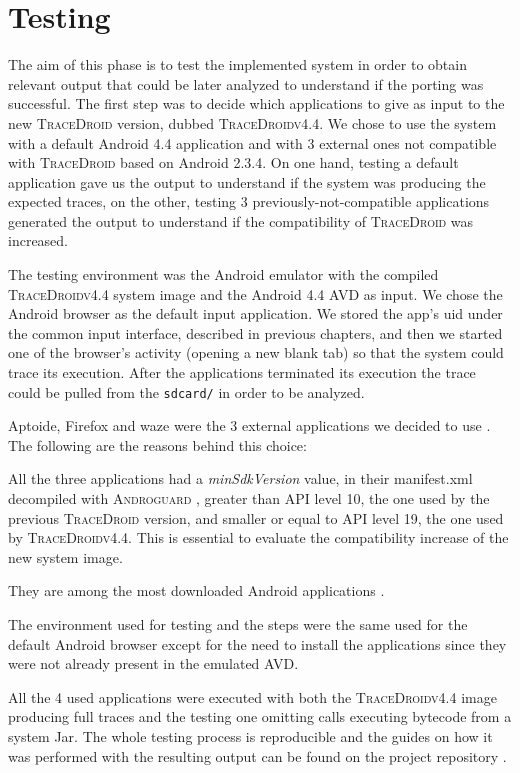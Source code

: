 \section{Testing}
\label{sec:eval_benchmarks}

The aim of this phase is to test the implemented system in order to
obtain relevant output that could be later analyzed to understand if
the porting was successful. The first step was to decide which
applications to give as input to the new \textsc{TraceDroid} version, dubbed \textsc{TraceDroidv4.4}. We chose
to use the system with a default Android 4.4 application and with 3
external ones not compatible with \textsc{TraceDroid} based on Android
2.3.4. On one hand, testing a default application gave us the output
to understand if the system was producing the expected traces, on the
other, testing 3 previously-not-compatible applications generated the
output to understand if the compatibility of \textsc{TraceDroid} was increased.

The testing environment was the Android emulator with the compiled
\textsc{TraceDroidv4.4} system image and the Android 4.4 AVD as input. We chose
the Android browser as the default input application. We stored the
app's uid under the common input interface, described in previous
chapters, and then we started one of the browser's activity (opening a
new blank tab) so that the system could trace its execution. After the
applications terminated its execution the trace could be pulled from
the \texttt{sdcard/} in order to be analyzed.

Aptoide, Firefox and waze were the 3 external applications we decided
to use \cite{ref23, ref24, ref25}. The following are the reasons behind this choice:
\begin{enumerate*}
  \item All the three applications had a \textit{minSdkVersion} value, in their
    manifest.xml decompiled with \textsc{Androguard} \cite{ref12}, greater
    than API level 10, the one used by the previous
    \textsc{TraceDroid} version, and smaller or equal to API level 19,
    the one used by \textsc{TraceDroidv4.4}. This is
    essential to evaluate the compatibility increase of the new system
    image.
  \item They are among the most downloaded Android applications \cite{ref26, ref27}.
\end{enumerate*}
The environment used for testing and the steps were the same used for
the default Android browser except for the need to install the
applications since they were not already present in the emulated AVD.

All the 4 used applications were executed with both the \textsc{TraceDroidv4.4}
image producing full traces and the testing one omitting
calls executing bytecode from a system Jar. The whole testing process
is reproducible and the guides on how it was performed with the
resulting output can be found on the project repository \cite{ref15}.
